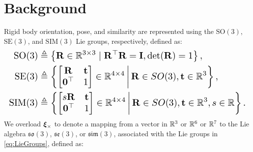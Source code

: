 \section{Background}
\label{sec:background}


Rigid body orientation, pose, and similarity are represented using the $\text{SO}(3)$, $\text{SE}(3)$, and $\text{SIM}(3)$ Lie groups, respectively, defined as:
%
\begin{gather}
\label{eq:LieGroups}
\scaleMathLine{\begin{aligned}
\text{SO}(3) &\triangleq \crl{ \bfR \in \bbR^{3 \times 3} \mid \bfR^\top\bfR = \bfI, \det(\bfR) = 1},\\
\text{SE}(3) &\triangleq \crl{ \begin{bmatrix} \bfR & \bft\\\mathbf{0}^\top & 1 \end{bmatrix} \in \bbR^{4 \times 4} \,\bigg\vert\, \bfR \in SO(3), \bft \in \bbR^3}, \\
\text{SIM}(3) &\triangleq \crl{ \begin{bmatrix} s\bfR & \bft\\\mathbf{0}^\top & 1 \end{bmatrix} \in \bbR^{4 \times 4} \,\bigg\vert\, \bfR \in SO(3), \bft \in \bbR^3, s \in \bbR}.
\end{aligned}}
\raisetag{10ex}
\end{gather}
%
We overload $\boldsymbol{\xi}_\times$ to denote a mapping from a vector in $\mathbb{R}^3$ or $\mathbb{R}^6$ or $\mathbb{R}^7$ to the Lie algebra $\mathfrak{so}(3)$, $\mathfrak{se}(3)$, or $\mathfrak{sim}(3)$, associated with the Lie groups in \eqref{eq:LieGroups}, defined as:
%
